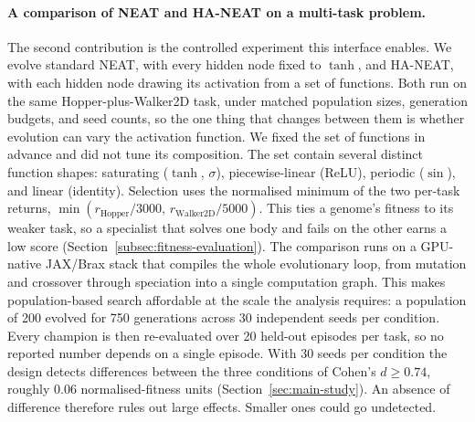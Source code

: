 \documentclass[12pt]{article}
\begin{document}
\paragraph{A comparison of NEAT and HA-NEAT on a multi-task problem.}
The second contribution is the controlled experiment this interface enables.
We evolve standard NEAT, with every hidden node fixed to $\tanh$, and HA-NEAT, with each hidden node drawing its activation from a set of functions.
Both run on the same Hopper-plus-Walker2D task, under matched population sizes, generation budgets, and seed counts, so the one thing that changes between them is whether evolution can vary the activation function.
We fixed the set of functions in advance and did not tune its composition.
The set contain several distinct function shapes: saturating ($\tanh$, $\sigma$), piecewise-linear (ReLU), periodic ($\sin$), and linear (identity).
Selection uses the normalised minimum of the two per-task returns, $\min(r_{\text{Hopper}}/3000,\, r_{\text{Walker2D}}/5000)$.
This ties a genome's fitness to its weaker task, so a specialist that solves one body and fails on the other earns a low score (Section~\ref{subsec:fitness-evaluation}).
The comparison runs on a GPU-native JAX/Brax stack \parencite{freeman_brax_2021,wang_tensorized_2024} that compiles the whole evolutionary loop, from mutation and crossover through speciation into a single computation graph.
This makes population-based search affordable at the scale the analysis requires: a population of 200 evolved for 750 generations across 30 independent seeds per condition.
Every champion is then re-evaluated over 20 held-out episodes per task, so no reported number depends on a single episode.
With 30 seeds per condition the design detects differences between the three conditions of Cohen's $d \geq 0.74$, roughly 0.06 normalised-fitness units (Section~\ref{sec:main-study}). An absence of difference therefore rules out large effects. Smaller ones could go undetected.

\end{document}
